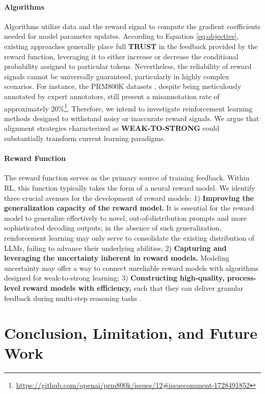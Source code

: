 \begin{itemize}[topsep=0pt]
\begin{itemize}[topsep=0pt]
\paragraph{Algorithms} Algorithms utilize data and the reward signal to compute the gradient coefficients needed for model parameter updates. According to Equation \ref{eq:objective}, existing approaches generally place full \textbf{TRUST} in the feedback provided by the reward function, leveraging it to either increase or decrease the conditional probability assigned to particular tokens. Nevertheless, the reliability of reward signals cannot be universally guaranteed, particularly in highly complex scenarios. For instance, the PRM800K datasets \citep{lightman2023let}, despite being meticulously annotated by expert annotators, still present a misannotation rate of approximately 20\%\footnote{\url{https://github.com/openai/prm800k/issues/12\#issuecomment-1728491852}}. Therefore, we intend to investigate reinforcement learning methods designed to withstand noisy or inaccurate reward signals. We argue that alignment strategies characterized as \textbf{WEAK-TO-STRONG} \citep{burns2023weak} could substantially transform current learning paradigms.

\paragraph{Reward Function} The reward function serves as the primary source of training feedback. Within RL, this function typically takes the form of a neural reward model. We identify three crucial avenues for the development of reward models: 1) \textbf{Improving the generalization capacity of the reward model.} It is essential for the reward model to generalize effectively to novel, out-of-distribution prompts and more sophisticated decoding outputs; in the absence of such generalization, reinforcement learning may only serve to consolidate the existing distribution of LLMs, failing to advance their underlying abilities; 2) \textbf{Capturing and leveraging the uncertainty inherent in reward models.} Modeling uncertainty may offer a way to connect unreliable reward models with algorithms designed for weak-to-strong learning; 3) \textbf{Constructing high-quality, process-level reward models with efficiency,} such that they can deliver granular feedback during multi-step reasoning tasks \citep{lightman2023let,wang2023math}.

\section{Conclusion, Limitation, and Future Work}


\end{itemize}
\end{itemize}
